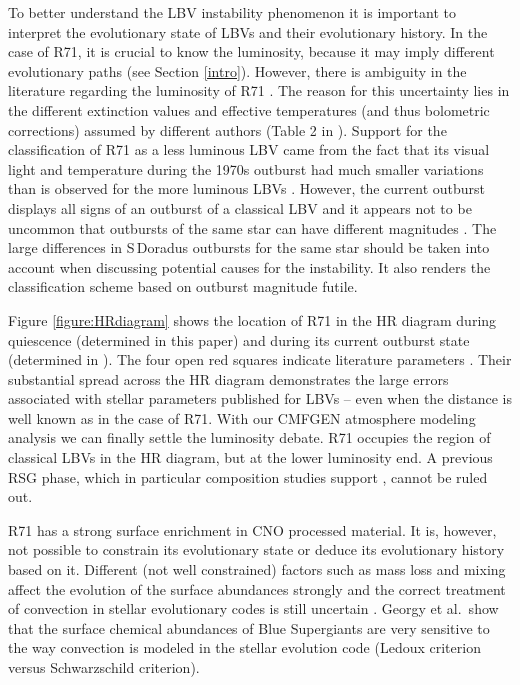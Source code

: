 \documentclass[structabstract]{aa}
\begin{document}
To better understand the LBV instability phenomenon it is important to interpret the evolutionary state of LBVs and their evolutionary history. In the case of R71, it is crucial to know the luminosity, because it may imply different evolutionary paths (see Section \ref{intro}).
However, there is ambiguity in the literature regarding the luminosity of R71 \citep{1981A&A...103...94W,1993SSRv...66..207L}. The reason for this uncertainty lies in the different extinction values and effective temperatures (and thus bolometric corrections) assumed by different authors (Table 2 in \citealt{2013A&A...555A.116M}). 
Support for the classification of R71 as a less luminous LBV came from the fact that its visual light and temperature during the 1970s outburst had much smaller variations than is observed for the more luminous LBVs  \citep{1974MNRAS.168..221T,1981A&A...103...94W}. However, the current outburst displays all signs of an outburst of a classical LBV and it appears not to be uncommon that outbursts of the same star can have different magnitudes \citep{2017AJ....154...15W}. The large differences in S\,Doradus outbursts for the same star should be taken into account when discussing potential causes for the instability. It also renders the classification scheme based on outburst magnitude futile.

Figure \ref{figure:HRdiagram} shows the location of R71 in the HR diagram during quiescence (determined in this paper) and during its current outburst state (determined in \citealt{2013A&A...555A.116M}).  The four open red squares indicate literature parameters \citep{1981A&A...103...94W,1982A&A...112...61V,1988A&AS...74..453V,1993SSRv...66..207L}. Their substantial spread across the HR diagram demonstrates the large errors associated with stellar parameters published for LBVs -- even when the distance is well known as in the case of R71.
With our CMFGEN atmosphere modeling analysis we can finally settle the luminosity debate. R71 occupies the region of classical LBVs in the HR diagram, but at the lower luminosity end. A previous RSG phase, which in particular composition studies support \citep{1999A&A...341L..67V,2010AJ....139...68V,2010A&A...518L.142B}, cannot be ruled out.

R71 has a strong surface enrichment in CNO processed material. It is, however, not possible to constrain its evolutionary state or deduce its evolutionary history based on it. Different (not well constrained) factors such as mass loss and mixing affect the  evolution of the surface abundances strongly \citep{2013LNP...865....3M} and the correct treatment of convection in stellar evolutionary codes is still uncertain \citep{2014MNRAS.439L...6G}. Georgy et al.\ show that the surface chemical abundances of Blue Supergiants are very sensitive to the way convection is modeled in the stellar evolution code (Ledoux criterion versus Schwarzschild criterion).
\end{document}
